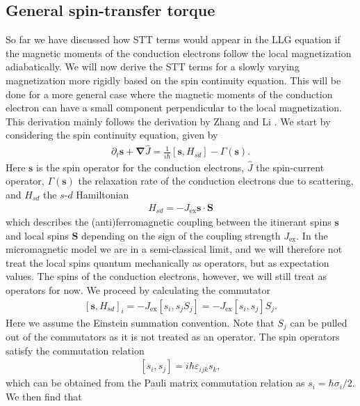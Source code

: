 \subsection{General spin-transfer torque} \label{sec:GeneralSTT}
So far we have discussed how STT terms would appear in the LLG equation if the magnetic moments of the conduction electrons follow the local magnetization adiabatically. We will now derive the STT terms for a slowly varying magnetization more rigidly based on the spin continuity equation. This will be done for a more general case where the magnetic moments of the conduction electron can have a small component perpendicular to the local magnetization. This derivation mainly follows the derivation by Zhang and Li \cite{ZhangLi-04}. We start by considering the spin continuity equation, given by
\begin{align}
\partial_t\mathbold{s} + \mathbold{\nabla}\hat{J} = \frac{1}{i\hbar} \left[\mathbold{s}, H_{sd}\right] - \Gamma(\mathbold{s}).
\end{align}
Here $\mathbold{s}$ is the spin operator for the conduction electrons, $\hat{J}$ the spin-current operator, $\Gamma(\mathbold{s})$ the relaxation rate of the conduction electrons due to scattering, and $H_{sd}$ the $s$-$d$ Hamiltonian
\begin{align}
H_{sd} = -J_{\textrm{ex}}\mathbold{s}\cdot\mathbold{S}
\end{align}
which describes the (anti)ferromagnetic coupling between the itinerant spins $\mathbold{s}$ and local spins $\mathbold{S}$ depending on the sign of the coupling strength $J_{\textrm{ex}}$. In the micromagnetic model we are in a semi-classical limit, and we will therefore not treat the local spins quantum mechanically as operators, but as expectation values. The spins of the conduction electrons, however, we will still treat as operators for now. We proceed by calculating the commutator
\begin{align}
\left[\mathbold{s}, H_{sd}\right]_i = -J_{\textrm{ex}} \left[s_i, s_j S_j\right] = -J_{\textrm{ex}}\left[s_i, s_j\right] S_j.
\end{align}
Here we assume the Einstein summation convention. Note that $S_j$ can be pulled out of the commutators as it is not treated as an operator. The spin operators satisfy the commutation relation
\begin{align}
\left[s_i, s_j\right] = i\hbar\varepsilon_{ijk}s_k,
\end{align}
which can be obtained from the Pauli matrix commutation relation as $s_i = \hbar \sigma_i/2$. We then find that
